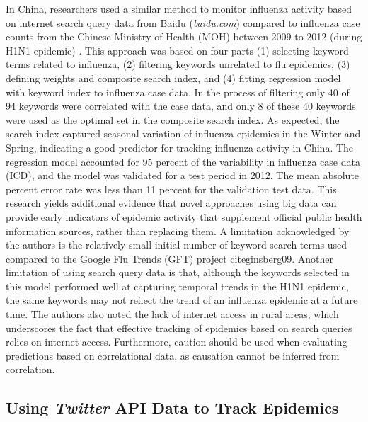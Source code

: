 \documentclass[sigconf]{acmart}
\begin{document}
In China, researchers used a similar method to monitor influenza activity based on
internet search query data from Baidu ({\it baidu.com}) compared to influenza case counts 
from the Chinese Ministry of Health (MOH) between 2009 to 2012 (during H1N1 epidemic) 
\cite{yuan13}. This approach was based on four parts (1) selecting keyword terms related 
to influenza, (2) filtering keywords unrelated to flu epidemics, (3) defining weights 
and composite search index, and (4) fitting regression model with keyword index to 
influenza case data. In the process of filtering only 40 of 94 keywords were correlated 
with the case data, and only 8 of these 40 keywords were used as the optimal set in the 
composite search index. As expected, the search index captured seasonal variation of 
influenza epidemics in the Winter and Spring, indicating a good predictor for tracking 
influenza activity in China. The regression model accounted for 95 percent of the
variability in influenza case data (ICD), and the model was validated for a test period 
in 2012. The mean absolute percent error rate was less than 11 percent for the validation
test data. This research yields additional evidence that novel approaches using big data 
can provide early indicators of epidemic activity that supplement official public health 
information sources, rather than replacing them. A limitation acknowledged by the authors
is the relatively small initial number of keyword search terms used compared to the 
Google Flu Trends (GFT) project cite{ginsberg09}. Another limitation of using search 
query data is that, although the keywords selected in this model performed well at 
capturing temporal trends in the H1N1 epidemic, the same keywords may not reflect the 
trend of an influenza epidemic at a future time. The authors also noted the lack of 
internet access in rural areas, which underscores the fact that effective tracking of 
epidemics based on search queries relies on internet access. Furthermore, caution should 
be used when evaluating predictions based on correlational data, as causation cannot be 
inferred from correlation.

\subsection{Using {\itshape Twitter} API Data to Track Epidemics}
\end{document}

